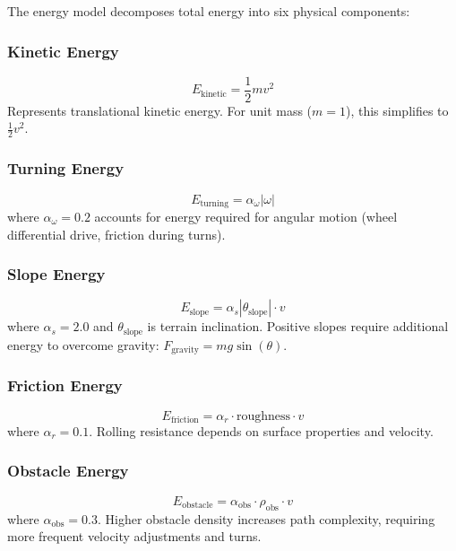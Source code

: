 The energy model decomposes total energy into six physical components:

\subsubsection{Kinetic Energy}
\begin{equation}
E_{\text{kinetic}} = \frac{1}{2} m v^2
\label{eq:kinetic_energy}
\end{equation}
Represents translational kinetic energy. For unit mass ($m=1$), this simplifies to $\frac{1}{2}v^2$.

\subsubsection{Turning Energy}
\begin{equation}
E_{\text{turning}} = \alpha_{\omega} |\omega|
\label{eq:turning_energy}
\end{equation}
where $\alpha_{\omega} = 0.2$ accounts for energy required for angular motion (wheel differential drive, friction during turns).

\subsubsection{Slope Energy}
\begin{equation}
E_{\text{slope}} = \alpha_s |\theta_{\text{slope}}| \cdot v
\label{eq:slope_energy}
\end{equation}
where $\alpha_s = 2.0$ and $\theta_{\text{slope}}$ is terrain inclination. Positive slopes require additional energy to overcome gravity: $F_{\text{gravity}} = mg\sin(\theta)$.

\subsubsection{Friction Energy}
\begin{equation}
E_{\text{friction}} = \alpha_r \cdot \text{roughness} \cdot v
\label{eq:friction_energy}
\end{equation}
where $\alpha_r = 0.1$. Rolling resistance depends on surface properties and velocity.

\subsubsection{Obstacle Energy}
\begin{equation}
E_{\text{obstacle}} = \alpha_{\text{obs}} \cdot \rho_{\text{obs}} \cdot v
\label{eq:obstacle_energy}
\end{equation}
where $\alpha_{\text{obs}} = 0.3$. Higher obstacle density increases path complexity, requiring more frequent velocity adjustments and turns.

